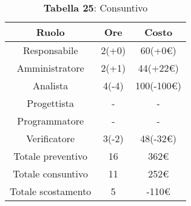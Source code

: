 \begin{table}[H]
	\centering
	\renewcommand{\arraystretch}{1.5}
	\begin{tabular}{|c|c|c|}
		\hline
		\rowcolor{lighter-grayer}
		Ruolo & Ore & Costo \\ \hline
		Responsabile & 2(+0) & 60(+0\euro) \\ \hline
		Amministratore & 2(+1) & 44(+22\euro) \\ \hline
		Analista & 4(-4) & 100(-100\euro) \\ \hline
		Progettista & - & - \\ \hline
		Programmatore & - & - \\ \hline
		Verificatore & 3(-2) & 48(-32\euro) \\ \hline
		Totale preventivo & 16 & 362\euro \\ \hline
		Totale consuntivo & 11 & 252\euro \\ \hline
		Totale scostamento & 5 & -110\euro \\ \hline
	\end{tabular}
	\caption*{\textbf{Tabella 25}: Consuntivo\\}
\end{table}

